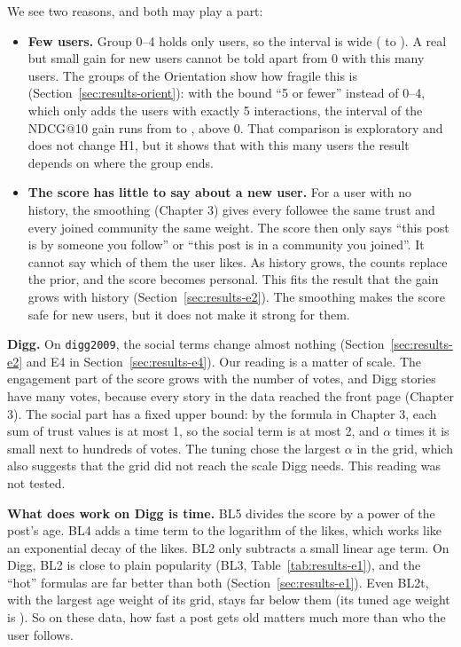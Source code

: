 We see two reasons, and both may play a part:
\begin{itemize}
  \item \textbf{Few users.} Group 0--4 holds only \eTwoWTwoMNdcgTenZeroFourN{} users, so the interval is wide (\eTwoWTwoMNdcgTenZeroFourCiLow{} to \eTwoWTwoMNdcgTenZeroFourCiHigh{}). A real but small gain for new users cannot be told apart from 0 with this many users. The groups of the Orientation show how fragile this is (Section~\ref{sec:results-orient}): with the bound ``5 or fewer'' instead of 0--4, which only adds the users with exactly 5 interactions, the interval of the NDCG@10 gain runs from \orientWTwoMNdcgTenZeroFiveCiLow{} to \orientWTwoMNdcgTenZeroFiveCiHigh{}, above 0. That comparison is exploratory and does not change H1, but it shows that with this many users the result depends on where the group ends.
  \item \textbf{The score has little to say about a new user.} For a user with no history, the smoothing (Chapter 3) gives every followee the same trust and every joined community the same weight. The score then only says ``this post is by someone you follow'' or ``this post is in a community you joined''. It cannot say which of them the user likes. As history grows, the counts replace the prior, and the score becomes personal. This fits the result that the gain grows with history (Section~\ref{sec:results-e2}). The smoothing makes the score safe for new users, but it does not make it strong for them.
\end{itemize}

\textbf{Digg.} On \texttt{digg2009}, the social terms change almost nothing (Section~\ref{sec:results-e2} and E4 in Section~\ref{sec:results-e4}). Our reading is a matter of scale. The engagement part of the score grows with the number of votes, and Digg stories have many votes, because every story in the data reached the front page (Chapter 3). The social part has a fixed upper bound: by the formula in Chapter 3, each sum of trust values is at most 1, so the social term is at most 2, and $\alpha$ times it is small next to hundreds of votes. The tuning chose the largest $\alpha$ in the grid, which also suggests that the grid did not reach the scale Digg needs. This reading was not tested.

\textbf{What does work on Digg is time.} BL5 divides the score by a power of the post's age. BL4 adds a time term to the logarithm of the likes, which works like an exponential decay of the likes. BL2 only subtracts a small linear age term. On Digg, BL2 is close to plain popularity (BL3, Table~\ref{tab:results-e1}), and the ``hot'' formulas are far better than both (Section~\ref{sec:results-e1}). Even BL2t, with the largest age weight of its grid, stays far below them (its tuned age weight is \tuneDiggBLTwoTChosen{}). So on these data, how fast a post gets old matters much more than who the user follows.

